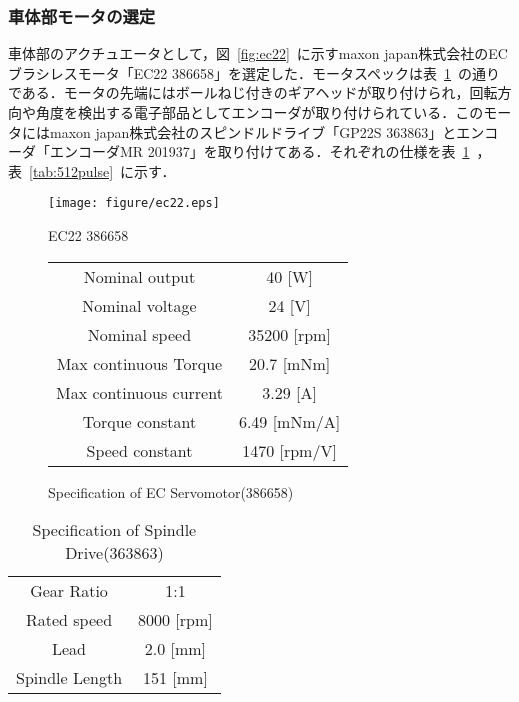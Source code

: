 \documentclass[a4paper,12pt]{article_vdlab_sotsuron}
\begin{document}
\newpage
\subsubsection{車体部モータの選定}
車体部のアクチュエータとして，図~\ref{fig:ec22}~に示すmaxon japan株式会社のECブラシレスモータ「EC22 386658」を選定した．モータスペックは表~\ref{tab:ec22}~の通りである．モータの先端にはボールねじ付きのギアヘッドが取り付けられ，回転方向や角度を検出する電子部品としてエンコーダが取り付けられている．このモータにはmaxon japan株式会社のスピンドルドライブ「GP22S 363863」とエンコーダ「エンコーダMR 201937」を取り付けてある．それぞれの仕様を表~\ref{tab:spindle}~，表~\ref{tab:512pulse}~に示す．

\vspace*{10mm}
\begin{figure}[htp]
  \begin{minipage}{0.3\textwidth}
    \begin{center}
      \texttt{[image: figure/ec22.eps]}
      \vspace*{3mm}
      \caption{EC22 386658}
      \label{fig:ec22}
    \end{center}
  \end{minipage}
  \begin{minipage}{0.7\textwidth}
      \begin{center}
	\makeatletter
	\def\@captype{table}   
	\makeatother
	\caption{Specification of EC Servomotor(386658)}
	\label{tab:ec22}
	  \begin{tabular}{cc}\hline
	    Nominal output & 40 [W] \\
	    Nominal voltage & 24 [V] \\
	    Nominal speed & 35200 [rpm] \\
	    Max continuous Torque & 20.7 [mNm] \\
	    Max continuous current & 3.29 [A] \\
	    Torque constant & 6.49 [mNm/A] \\
	    Speed constant & 1470 [rpm/V] \\\hline 
	  \end{tabular}  
	\end{center}
  \end{minipage}
\end{figure}

\vspace*{10mm}
\begin{table}[htp]
  \begin{center}
    \makeatletter
      \def\@captype{table}   
      \makeatother
      \caption{Specification of Spindle Drive(363863)}
      \label{tab:spindle}
	\begin{tabular}{cc}\hline
	  Gear Ratio & 1:1 \\
	  Rated speed & 8000 [rpm] \\
	  Lead & 2.0 [mm] \\
	  Spindle Length & 151 [mm] \\\hline
	\end{tabular}  
  \end{center}
\end{table}
\end{document}
